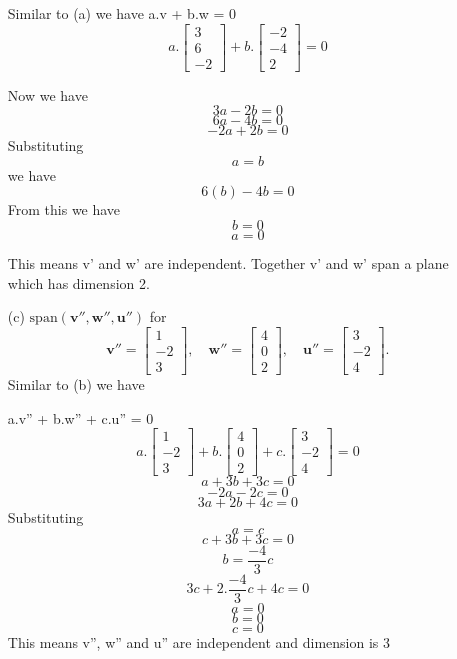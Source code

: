 \begin{enumerate}
    Similar to (a) we have 
    a.v + b.w = 0
    \[
    a.\begin{bmatrix}
    3 \\ 6 \\ -2
    \end{bmatrix} + b.\begin{bmatrix}
    -2 \\ -4 \\ 2
    \end{bmatrix} = 0
    \]

   Now we have
    \[
      3a - 2b =0 
    \]
    \[
      6a - 4b =0 
    \]
    \[
      -2a + 2b =0 
    \]
    Substituting
    \[
    a = b
    \]
    we have 
    \[
    6(b)-4b=0
    \]
    From this we have
     \[
    b=0
    \]
     \[
    a=0
    \]

   This means v' and w' are independent.  Together v' and w' span a plane which has dimension 2.
    
    \item[(c)] $\text{span}(\mathbf{v''}, \mathbf{w''},\mathbf{u''})$ for 
    \[
    \mathbf{v''} =
    \begin{bmatrix}
    1 \\ -2 \\ 3
    \end{bmatrix},
    \quad
    \mathbf{w''} =
    \begin{bmatrix}
    4 \\ 0 \\ 2
    \end{bmatrix},
    \quad
    \mathbf{u''} =
    \begin{bmatrix}
    3 \\ -2 \\ 4
    \end{bmatrix}.
    \]
    Similar to (b) we have

    a.v'' + b.w'' + c.u'' = 0
    \[
    a.\begin{bmatrix}
    1 \\ -2 \\ 3
    \end{bmatrix} 
    + b .\begin{bmatrix}
    4 \\ 0 \\ 2
    \end{bmatrix}
    + c . \begin{bmatrix}
    3 \\ -2 \\ 4
    \end{bmatrix} = 0
    \]
    \[
    a+3b+3c = 0
    \]
    \[
    -2a-2c = 0
    \]
     \[
    3a+2b+4c = 0
    \]
    Substituting 
    \[
    a = c 
    \]
    \[
    c+3b+3c = 0
    \]
    \[
    b=\frac{-4}{3}c
    \]
    \[
    3c+2.\frac{-4}{3}c+4c=0
    \]
    \[
    a=0
    \]
    \[
    b=0
    \]
    \[
    c=0
    \]
    This means v'', w'' and u'' are independent and dimension is 3
\end{enumerate}


